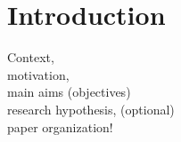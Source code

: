 \chapter{Introduction}
  Context,\\ motivation,\\ main aims	(objectives) \\ research hypothesis, (optional) \\ paper organization!
